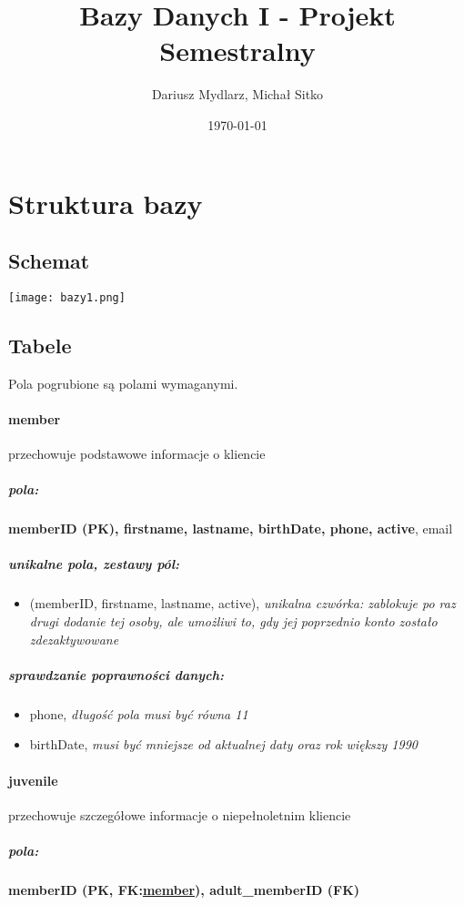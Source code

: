 \documentclass[12pt,a4paper,titlepage]{article}
\title{Bazy Danych I - Projekt Semestralny}
\author{Dariusz Mydlarz, Michał Sitko}
\date{\today}
\begin{document}
\maketitle
\newpage


\section{Struktura bazy}
\subsection{Schemat}
\begin{center}
	\texttt{[image: bazy1.png]}
	\label{fig:schemat}
\end{center}


\subsection{Tabele}
Pola pogrubione są polami wymaganymi.
\paragraph{member}
przechowuje podstawowe informacje o kliencie
\subparagraph{pola:}
\textbf{memberID (PK), firstname, lastname, birthDate, phone, active}, email
\subparagraph{unikalne pola, zestawy pól:}
\begin{itemize}
	\item (memberID, firstname, lastname, active), \textit{unikalna czwórka: zablokuje po raz drugi dodanie tej osoby, ale umożliwi to, gdy jej poprzednio konto zostało zdezaktywowane}
\end{itemize}
\subparagraph{sprawdzanie poprawności danych:}
\begin{itemize}
	\item phone, \textit{długość pola musi być równa 11}
	\item birthDate, \textit{musi być mniejsze od aktualnej daty oraz rok większy 1990}
\end{itemize}

\paragraph{juvenile} przechowuje szczegółowe informacje o niepełnoletnim kliencie
\subparagraph{pola:}
\textbf{memberID (PK, FK:\underline{member}), adult\_memberID (FK)}
\end{document}

